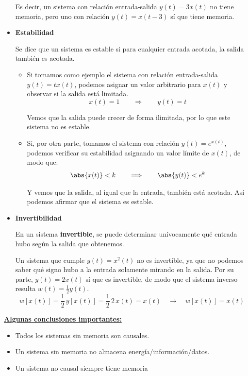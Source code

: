 \documentclass[a4paper]{book}
\begin{document}
\begin{itemize}
	      Es decir, un sistema con relación entrada-salida $y(t) = 3x(t)$ no tiene memoria, pero uno con relación $y(t) = x(t-3)$ sí que tiene memoria.

	\item \textbf{Estabilidad}

	      Se dice que un sistema es estable si para cualquier entrada acotada, la salida también es acotada.
	      \begin{itemize}
		      \item Si tomamos como ejemplo el sistema con relación entrada-salida $y(t) = tx(t)$, podemos asignar un valor arbitrario para $x(t)$ y observar si la salida está limitada. \[x(t) = 1 \qquad \Longrightarrow \qquad y(t) = t\]

		            Vemos que la salida puede crecer de forma ilimitada, por lo que este sistema no es estable.
		      \item Si, por otra parte, tomamos el sistema con relación $y(t) = e^{x(t)}$, podemos verificar su estabilidad asignando un valor límite de $x(t)$, de modo que: \[\abs{x(t)} < k \qquad \Longrightarrow \qquad \abs{y(t)} < e^k\]

		            Y vemos que la salida, al igual que la entrada, también está acotada. Así podemos afirmar que el sistema es estable.
	      \end{itemize}


	\item \textbf{Invertibilidad}

	      En un sistema \textbf{invertible}, se puede determinar unívocamente qué entrada hubo según la salida que obtenemos.

	      Un sistema que cumple $y(t) = x^2(t)$ no es invertible, ya que no podemos saber qué signo hubo a la entrada solamente mirando en la salida. Por su parte, $y(t) = 2x(t)$ sí que es invertible, de modo que el sistema inverso resulta $w(t) = \frac{1}{2}y(t)$. \[w \left[ x(t) \right] = \frac{1}{2}\,  y\left[ x(t) \right] = \frac{1}{2}\, 2\, x(t) = x(t) \quad \longrightarrow \quad \boxed{ w \left[ x(t) \right] = x(t)}\]

\end{itemize}

\underline{\textbf{Algunas conclusiones importantes:}}
\begin{itemize}
	\item Todos los sistemas sin memoria son causales.
	\item Un sistema sin memoria no almacena energía/información/datos.
	\item Un sistema no causal siempre tiene memoria
\end{itemize}
\end{document}
